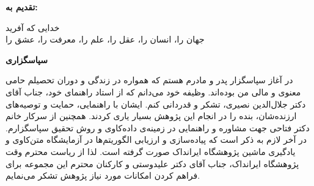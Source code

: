 \thispagestyle{empty}

\noindent
\textbf{\Large تقدیم به:}
\vskip 1cm

\noindent خدایی که آفرید \\
جهان را، انسان را، عقل را، علم را، معرفت را، عشق را

\newpage
\thispagestyle{empty}

\begin{center}
\textbf{\Large سپاسگزاری}
\end{center}
\vskip 1cm
\noindent در آغاز سپاسگزار پدر و مادرم هستم که همواره در زندگی و دوران تحصیلم حامی معنوی و مالی من بوده‌اند. وظیفه خود می‌دانم  که از استاد راهنمای خود، جناب آقای دکتر جلال‌الدین نصیری، تشکر و قدردانی کنم. ایشان با راهنمایی، حمایت و توصیه‌های ارزنده‌شان، بنده را در انجام این پژوهش بسیار یاری کردند. همچنین از سرکار خانم دکتر فتاحی  جهت مشاوره و راهنمایی در زمینه‌ی داده‌کاوی و روش تحقیق سپاسگزارم. در آخر لازم به ذکر است که پیاده‌سازی و ارزیابی الگوریتم‌ها در آزمایشگاه متن‌کاوی و یادگیری ماشین  پژوهشگاه ایرانداک صورت گرفته است. لذا از ریاست محترم وقت پژوهشگاه ایرانداک، جناب آقای دکتر علیدوستی و کارکنان محترم این مجموعه برای فراهم کردن امکانات مورد نیاز پژوهش تشکر می‌نمایم. 

\vskip 1cm
